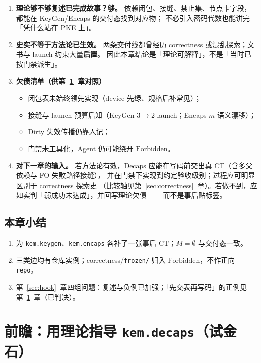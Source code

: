 \documentclass[UTF8,a4paper,11pt]{ctexart}
\theoremstyle{definition}
\theoremstyle{plain}
\theoremstyle{remark}
\numberwithin{figure}{section}
\numberwithin{table}{section}
\begin{document}
\begin{enumerate}
  \item \textbf{理论够不够复述已完成故事？够。}
        依赖闭包、接缝、禁止集、节点卡字段，都能在 KeyGen/Encaps 的交付态找到对应物；
        不必引入密码代数也能讲完「凭什么站在 PKE 上」。
  \item \textbf{史实不等于方法论已生效。}
        两条交付线都曾经历 correctness 或混乱探索；文书与 launch 约束大量\textbf{后置}。
        因此本章结论是「理论可解释」，不是「当时已按门禁派生」。
  \item \textbf{欠债清单（供第~\ref{sec:forward}~章对照）}
        \begin{itemize}
          \item 闭包表未始终领先实现（device 先绿、规格后补常见）；
          \item 接缝与 launch 预算后知（KeyGen 3$\to$2 launch；Encaps $m$ 语义漂移）；
          \item Dirty 失效传播仍靠人记；
          \item 门禁未工具化，Agent 仍可能绕开 $\mathrm{Forbidden}$。
        \end{itemize}
  \item \textbf{对下一章的输入。}
        若方法论有效，Decaps 应能在写码前交出真 $\mathrm{CT}$（含多父依赖与 FO 失败路径接缝），
        并在门禁下实现到约定验收级别；过程应可明显区别于 correctness 探索史
        （比较轴见第~\ref{sec:correctness}~章）。若做不到，应如实判「弱成功未达成」，并回写理论欠债——
        而不是事后贴标签。
\end{enumerate}

\subsection{本章小结}
\label{sec:replay-summary}

\begin{enumerate}
  \item 为 \texttt{kem.keygen}、\texttt{kem.encaps} 各补了一张事后 $\mathrm{CT}$；$M=\emptyset$ 与交付态一致。
  \item 三类边均有仓库实例；correctness/\texttt{frozen/} 归入 $\mathrm{Forbidden}$，不作正向 \texttt{repo}。
  \item 第~\ref{sec:hook}~章四组问题：复述与负例已加强；「先交表再写码」的正例见第~\ref{sec:forward}~章（已判决）。
\end{enumerate}

\section{前瞻：用理论指导 \texttt{kem.decaps}（试金石）}
\label{sec:forward}
\end{document}
